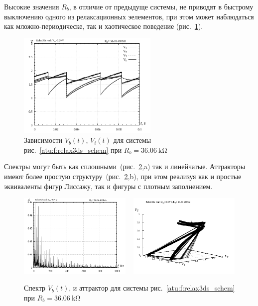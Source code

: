 Высокие значения $R_b$, в отличие от предыдуще системы,
не приводят в быстрому выключению одного из релаксационных
эелементов, при этом может наблюдаться как мложно-периодическе,
так и хаотическое поведение
(рис.~\ref{atu:f:relax3ds_t_36060}).

\begin{figure}[htb!]
  \centerline{\includegraphics[width=0.6\textwidth]{p/relax3ds_t_036060.png} }
  \caption{Зависимости $V_b(t)$, $V_i(t)$ для системы рис.~\ref{atu:f:relax3ds_schem} при $R_b=\SI{36.06}{\kilo\ohm}$ }
  \label{atu:f:relax3ds_t_36060}
\end{figure}

Спектры могут быть как сплошными~(рис.~\ref{atu:f:relax3ds_f_36060},a)
так и линейчатые.
Аттракторы имеют более простую структуру~(рис.~\ref{atu:f:relax3ds_f_36060},b),
при этом реализуя как и простые эквиваленты фигур Лиссажу,
так и фигуры с плотным заполнением.

\begin{figure}[htb!]
  \centerline{
    \includegraphics[width=0.48\textwidth]{p/relax3ds_f_036060.png}
    ~
    \includegraphics[width=0.48\textwidth]{p/relax3ds_v1v2v3_036060.png}
  }
  \caption{Спектр $V_b(t)$, и аттрактор для системы рис.~\ref{atu:f:relax3ds_schem} при $R_b=\SI{36.06}{\kilo\ohm}$ }
  \label{atu:f:relax3ds_f_36060}
\end{figure}


